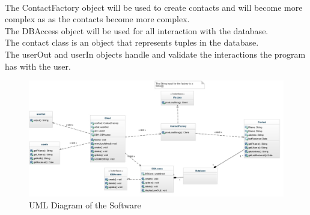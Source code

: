 \documentclass{article}
\begin{document}
\paragraph{}
The ContactFactory object will be used to create contacts and will become more complex as as the contacts become more complex. \\
The DBAccess object will be used for all interaction with the database. \\
The contact class is an object that represents tuples in the database. \\
The userOut and userIn objects handle and validate the interactions the program has with the user. \\
\begin{figure}[H]
\centering
\includegraphics[width=170mm]{img/UML.jpg}
\caption{UML Diagram of the Software \label{UML}}
\end{figure}




\end{document}
